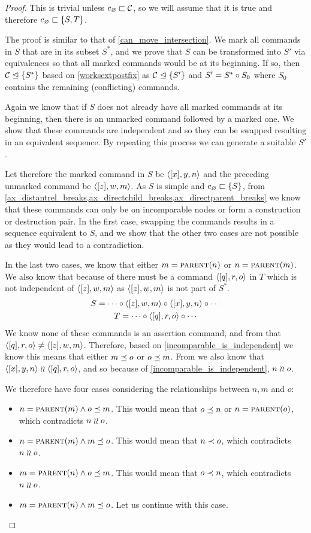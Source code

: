\begin{proof}
This is trivial unless $c_\varnothing\sqsubset{\mathcal{C}}$, so we will assume that it is true
and therefore $c_\varnothing\sqsubset{\{{S,T}\}}$.

The proof is similar to that of \cref{can_move_intersection}.
We mark all commands in $S$ that are in its subset $S^*$, and
we prove that $S$ can be transformed into $S'$ via equivalences
so that all marked commands would be at its beginning.
If so, then 
${\mathcal{C}}\trianglelefteq{\{{S^*}\}}$ 
based on \cref{worksextpostfix}
as ${\mathcal{C}}\trianglelefteq{\{{S'}\}}$ and $S'=S^*\circ S_0$ 
where $S_0$ contains the remaining (conflicting) commands.

Again we know that if $S$ does not already have all marked commands at its beginning,
then there is an unmarked command followed by a marked one.
We show that these commands are independent and so they can be swapped
resulting in an equivalent sequence.
By repeating this process we can generate a suitable $S'$.

Let therefore the marked command in $S$ be $\langle{[x],y,n}\rangle$
and the preceding unmarked command be $\langle{[z],w,m}\rangle$.
As $S$ is simple and $c_\varnothing\sqsubset{\{{S}\}}$, from 
\cref{ax_distantrel_breaks,ax_directchild_breaks,ax_directparent_breaks}
we know that these commands can only be on incomparable nodes or form a construction or destruction pair.
In the first case, swapping the commands results in a sequence equivalent to $S$,
and we show that the other two cases are not possible as they would lead to a contradiction.

In the last two cases, we know that either $m=\text{\normalfont\scshape{parent}}(n)$ or $n=\text{\normalfont\scshape{parent}}(m)$.
We also know that because of {\condApr} there must be 
a command $\langle{[q],r,o}\rangle$ in $T$ which is not independent of $\langle{[z],w,m}\rangle$
as $\langle{[z],w,m}\rangle$ is not part of $S^*$.
\begin{gather*}
S = \cdots\circ  \langle{[z],w,m}\rangle\circ  \langle{[x],y,n}\rangle\circ  \cdots \\
T = \cdots\circ  \langle{[q],r,o}\rangle\circ \cdots
\end{gather*}
We know none of these commands is an assertion command, and 
from {\condDisj} that $\langle{[q],r,o}\rangle\neq\langle{[z],w,m}\rangle$.
Therefore, based on \cref{incomparable_is_independent} we know this means that
either $m\preceq o$ or $o\preceq m$.
From {\condApr} we also know that $\langle{[x],y,n}\rangle\mathrel{\wr\wr} \langle{[q],r,o}\rangle$,
and so because of \cref{incomparable_is_independent},
$n\mathrel{\wr\wr} o$.

We therefore have four cases considering the relationships between $n,m$ and $o$:
\begin{itemize}
\item $n=\text{\normalfont\scshape{parent}}(m) \wedge o\preceq m$.
   This would mean that $o\preceq n$ or $n=\text{\normalfont\scshape{parent}}(o)$, which contradicts $n\mathrel{\wr\wr} o$.
\item $n=\text{\normalfont\scshape{parent}}(m) \wedge m\preceq o$.
   This would mean that $n\prec o$, which contradicts $n\mathrel{\wr\wr} o$.
\item $m=\text{\normalfont\scshape{parent}}(n) \wedge o\preceq m$.
   This would mean that $o\prec n$, which contradicts $n\mathrel{\wr\wr} o$.
\item $m=\text{\normalfont\scshape{parent}}(n) \wedge m\preceq o$.
   Let us continue with this case.
\end{itemize}


\end{proof}
